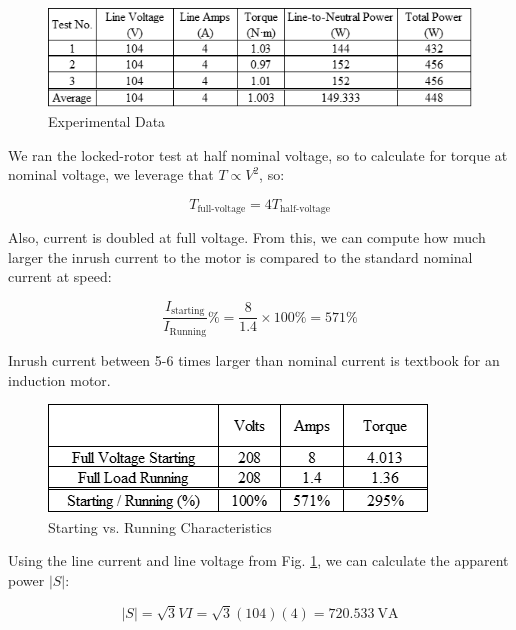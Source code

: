 \documentclass{IEEEtran}
\begin{document}
\begin{figure}[h!]
    \includegraphics[width=\columnwidth]{table1.png}
    \caption{Experimental Data}
    \centering
    \label{fig:table1}
\end{figure}

We ran the locked-rotor test at half nominal voltage, so to calculate for torque at nominal voltage, we leverage that \(T\propto V^2\), so:

\begin{equation}
    T_{\text{full-voltage}} = 4 T_{\text{half-voltage}}
\end{equation}

Also, current is doubled at full voltage. From this, we can compute how much larger the inrush current to the motor is compared to the standard nominal current at speed:

\begin{equation}
    \frac{I_{\text{starting}}}{I_{\text{Running}}} \% = \frac{8}{1.4} \times 100 \% = 571\%
\end{equation}

Inrush current between 5-6 times larger than nominal current is textbook for an induction motor.

\begin{figure}[h!]
    \includegraphics[width=\columnwidth]{table2.png}
    \caption{Starting vs. Running Characteristics}
    \centering
    \label{fig:table2}
\end{figure}

Using the line current and line voltage from Fig. \ref{fig:table1}, we can calculate the apparent power \(|S|\):

\begin{equation}
    |S| = \sqrt{3}VI = \sqrt{3}(104)(4) = 720.533 ~ \text{VA}
\end{equation}
\end{document}
